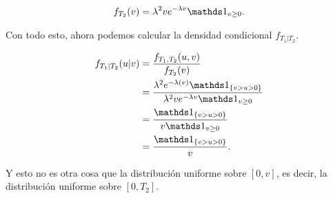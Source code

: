 \begin{align}
    f_{T_2}(v) = \lambda^2 v e^{-\lambda v} \indic_{v \geq 0}.
\end{align}

Con todo esto, ahora podemos calcular la densidad condicional $f_{T_1 | T_2}$.

\begin{align}
    f_{T_1 | T_2}(u | v)    &=     \frac{f_{T_1 , T_2}(u, v)}{ f_{T_2}(v)}                                                                      \\
                            &=     \frac{\lambda^2 e^{-\lambda (v)} \indic_{\{ v > u > 0 \}}}{ \lambda^2 v e^{-\lambda v} \indic_{v \geq 0}}    \\
                            &=     \frac{ \indic_{\{ v > u > 0 \}}}{ v  \indic_{v \geq 0}}                                                      \\
                            &=     \frac{ \indic_{\{ v > u > 0 \}}}{v}.                                                      
\end{align}\pn

Y esto no es otra cosa que la distribución uniforme sobre $[0, v]$, es decir, la distribución uniforme sobre $[0, T_2]$.